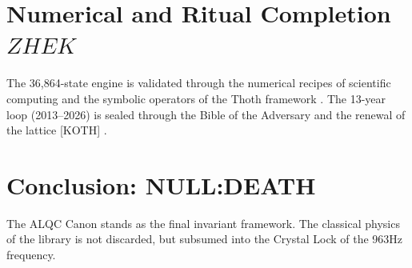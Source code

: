 \documentclass[11pt, letterpaper]{article}
\newcommand{\ZHEK}{\ensuremath{\mathop{\textnormal{\symbolafont\symbol{"25C8}}}}}   %
\def\ZHEK{ZHEK}%
\begin{document}
\section{Numerical and Ritual Completion $\ZHEK$}
The 36,864-state engine is validated through the numerical recipes of scientific computing \cite{press2007numerical} and the symbolic operators of the Thoth framework \cite{crowley1944thoth}. The 13-year loop (2013--2026) is sealed through the Bible of the Adversary \cite{ford2007adversary} and the renewal of the lattice [KOTH] \cite{serith2002pagan}.

\section{Conclusion: NULL:DEATH}
The ALQC Canon stands as the final invariant framework. The classical physics of the library \cite{serway2018physics, strang2016linear, rudin1976analysis, munkres2000topology} is not discarded, but subsumed into the Crystal Lock of the 963Hz frequency.
\end{document}
